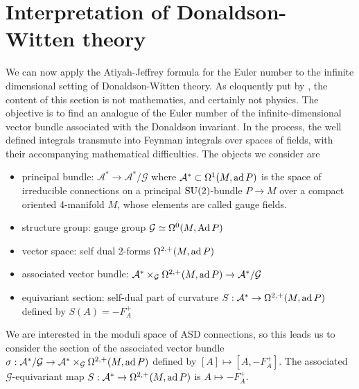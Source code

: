 \section{Interpretation of Donaldson-Witten theory}
We can now apply the Atiyah-Jeffrey formula for the Euler number to the infinite 
dimensional setting of Donaldson-Witten theory. As eloquently put by \citet{naber},
the content of this section is not mathematics, and certainly not physics. The
objective is to find an analogue of the Euler number of the
infinite-dimensional vector bundle associated with the Donaldson invariant. In
the process, the well defined integrals transmute into Feynman integrals
over spaces of fields, with their accompanying mathematical difficulties.  
The objects we consider are 
\begin{itemize}
	\item principal bundle: $\mathcal{A}^* \to \mathcal{A}^* /\mathcal{G}$ where 
	$\mathcal{A}^* \subset \Omega^1(M,\operatorname{ad} P)$ is the
	space of irreducible connections   on a principal $\operatorname{SU}(2)$-bundle  $P\to M$
	over a compact oriented 4-manifold $M$, whose elements are called gauge
	fields.
	\item structure group: gauge group $\mathcal{G}\simeq \Omega^0(M,\operatorname{Ad} P)$
	\item vector space: self dual 2-forms $\Omega^{2,+}(M,\operatorname{ad} P)$ 
	\item associated vector bundle: $\mathcal{A}^* \times_\mathcal{G}
		\Omega^{2,+}(M,\operatorname{ad} P)  \to \mathcal{A}^* /\mathcal{G}$
	\item equivariant section: self-dual part of curvature $S : \mathcal{A}^* \to
		\Omega^{2,+}(M,\operatorname{ad} P)$ defined by $S(A)=-F_A^+$
\end{itemize}

We are interested in the moduli space of ASD connections, so this leads us to
consider the section of the associated vector bundle 
$\sigma : \mathcal{A}^* /\mathcal{G} \to \mathcal{A}^*\times_\mathcal{G}
\Omega^{2,+}(M,\operatorname{ad} P)$ defined by $[A]\mapsto [A,-F_A^+]$. 
The associated $\mathcal{G}$-equivariant map $S : \mathcal{A}^* \to
\Omega^{2,+}(M,\operatorname{ad} P)$ is $A \mapsto -F_A^+$.

